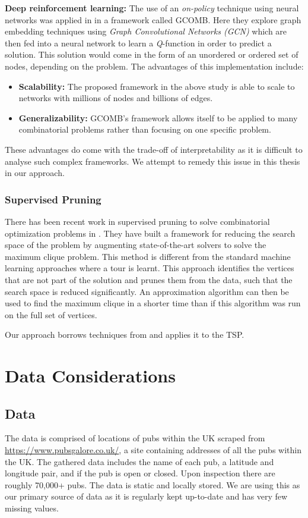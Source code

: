 \documentclass[]{UCD_CS_FYP_Report}
\begin{document}
\textbf{Deep reinforcement learning:}
The use of an \textit{on-policy} technique using neural networks was applied in \cite{DeepRL} in a framework called \textsc{GCOMB}. Here they explore graph embedding techniques using \textit{Graph Convolutional Networks (GCN)} which are then fed into a neural network to learn a \textit{Q}-function in order to predict a solution. This solution would come in the form of an unordered or ordered set of nodes, depending on the problem. The advantages of this implementation include: 
\begin{itemize}
  \item \textbf{Scalability: }The proposed framework in the above study is able to scale to networks with millions of nodes and billions of edges.
  \item \textbf{Generalizability: }\textsc{GCOMB}'s framework allows itself to be applied to many combinatorial problems rather than focusing on one specific problem.
\end{itemize}
These advantages do come with the trade-off of interpretability as it is difficult to analyse such complex frameworks. We attempt to remedy this issue in this thesis in our approach.

\subsection{Supervised Pruning}
There has been recent work in supervised pruning to solve combinatorial optimization problems in \cite{iAAA}. They have built a framework for reducing the search space of the problem by augmenting state-of-the-art solvers to solve the maximum clique problem. This method is different from the standard machine learning approaches where a tour is learnt. This approach identifies the vertices that are not part of the solution and prunes them from the data, such that the search space is reduced significantly. An approximation algorithm can then be used to find the maximum clique in a shorter time than if this algorithm was run on the full set of vertices.

Our approach borrows techniques from \cite{iAAA} and applies it to the TSP.




\chapter{Data Considerations}
\section{Data}
The data is comprised of locations of pubs within the UK scraped from \url{https://www.pubsgalore.co.uk/}, a site containing addresses of all the pubs within the UK. The gathered data includes the name of each pub, a latitude  and longitude pair, and if the pub is open or closed.  Upon inspection there are roughly 70,000+ pubs. The data is static and locally stored. We are using this as our primary source of data as it is regularly kept up-to-date and has very few missing values.
\end{document}
